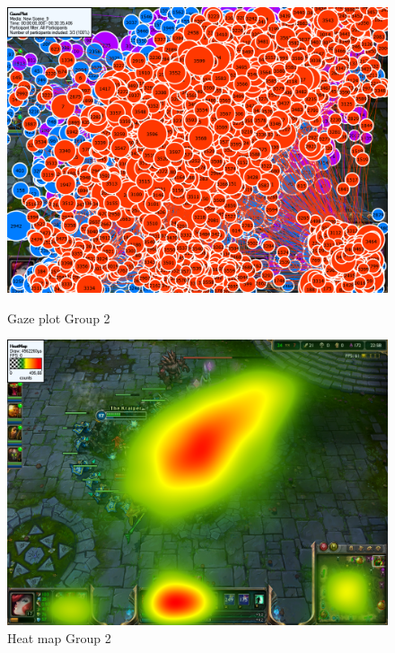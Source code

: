\documentclass[notitlepage]{report}
\begin{document}
\begin{figure}[ht]
\begin{minipage}[b]{0.45\linewidth}
\centering
\includegraphics[width=\textwidth]{images/gazeplot/Pros}
\caption{Gaze plot Group 2}
\label{gaze_pro}
\end{minipage}
\hspace{0.5cm}
\begin{minipage}[b]{0.45\linewidth}
\centering
\includegraphics[width=\textwidth]{images/heatmap/Pros}
\caption{Heat map Group 2}
\label{heat_pro}
\end{minipage}
\end{figure}
\end{document}
